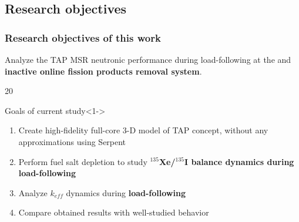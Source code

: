\subsection{Research objectives}

\begin{frame}
  \frametitle{Research objectives of this work}
     Analyze the TAP MSR neutronic performance during load-following at the 
      and \textbf{inactive online fission products removal 
     system}.
  \begin{overlayarea}{\linewidth}{20\baselineskip}
     \begin{block}{Goals of current study}<1->
         \begin{enumerate}
         		\itemsep1em
                \item<1-> Create high-fidelity full-core 3-D model of 
                TAP concept, without any
approximations 
                using Serpent 
                \cite{leppanen_serpent_2014}
                \item<2-> Perform fuel salt depletion to study 
                \textbf{$^{135}$Xe/$^{135}$I balance dynamics during 
                load-following}
            	\item<3-> Analyze $k_{eff}$ dynamics during 
            	\textbf{load-following}
                \item<4-> Compare obtained results with well-studied 
                 behavior
         \end{enumerate}
      \end{block}
  \end{overlayarea}
\end{frame}
